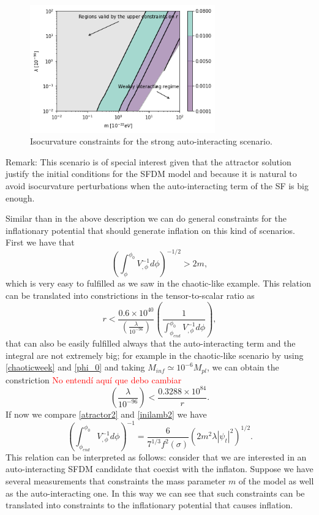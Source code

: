 \documentclass[amssymb,twocolumn,prd,nofootinbib,showpacs]{revtex4-1}
\begin{document}
\begin{figure}
\includegraphics[width=8cm]{stronglamb.png}
\caption{Isocurvature constraints for the strong auto-interacting scenario.}\label{constraintsSFDMls}
\end{figure} 

Remark: This scenario is of special interest given that the attractor solution justify the initial conditions for the SFDM model and because it is natural to avoid isocurvature perturbations when the auto-interacting term of the SF is big enough. 

Similar than in the above description we can do general constraints for the inflationary potential that should generate inflation on this kind of scenarios. First we have that
\begin{equation}
\left(\int^{\phi_0}_\phi V_{,\phi}^{-1}d\phi\right)^{-1/2}>2m,
\end{equation}
which is very easy to fulfilled as we saw in the chaotic-like example. This relation can be translated into constrictions in the tensor-to-scalar ratio as
\begin{equation}
r<\frac{0.6\times 10^{40}}{\left(\frac{\lambda}{10^{-96}}\right)}\left(\frac{1}{\int_{\phi_{end}}^{\phi_0}V_{,\phi}^{-1}d\phi}\right),
\end{equation}
that can also be easily fulfilled always that the auto-interacting term and the integral are not extremely big; for example in the chaotic-like scenario by using \eqref{chaoticweek} and \eqref{phi_0}
and taking $M_{inf}\simeq 10^{-6}M_{pl} $, we can obtain the constriction \textcolor{red}{No entend\'i aqu\'i que debo cambiar}
\begin{equation}
\left(\frac{\lambda}{10^{-96}}\right)<\frac{0.3288\times 10^{84}}{r}.
\end{equation}
If now we compare \eqref{atractor2} and \eqref{inilamb2} we have
\begin{equation}\label{inilamb3}
\left(\int_{\phi_{end}}^{\phi_0}V^{-1}_{,\phi}d\phi\right)^{-1}=\frac{6}{7^{1/3}f^2(\sigma)}\left(2m^2\lambda|\psi_t|^2\right)^{1/2}.
\end{equation}
This relation can be interpreted as follows: consider that we are interested in an auto-interacting SFDM candidate that coexist with the inflaton. Suppose we have several measurements that constraints the mass parameter $m$ of the model as well as the auto-interacting one. In this way we can see that such constraints can be translated into constraints to the inflationary potential that causes inflation.  
\end{document}
